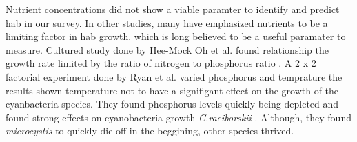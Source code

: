Nutrient concentrations did not show a viable paramter to identify and predict \gls{hab} in our survey. In other studies, many have emphasized nutrients to be a limiting factor in \gls{hab} growth.  which is long believed to be a useful paramater to measure. Cultured study done by Hee-Mock Oh et al. found relationship the growth rate limited by the ratio of nitrogen to phosphorus ratio \cite{oh_microcystin_2000}.  A 2 x 2 factorial experiment done by Ryan et al. varied phosphorus and temprature the results shown temperature not to have a signifigant effect on the growth of the cyanbacteria species. They found phosphorus levels quickly being depleted and found strong effects on cyanobacteria growth  \emph{C.raciborskii} \cite{ryan_effects_2017}. Although, they found \emph{microcystis} to quickly die off in the beggining, other species thrived.








